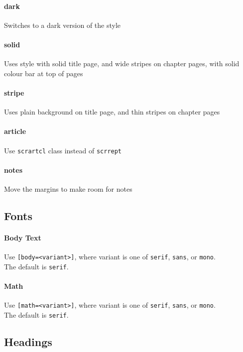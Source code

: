 \documentclass[solid,math,chem,code,plot,gloss]{bmc}
\begin{document}
\paragraph{\ttfamily dark}
Switches to a dark version of the style
\paragraph{\ttfamily solid}
Uses style with solid title page, and wide stripes on chapter pages, with solid colour bar at top of pages
\paragraph{\ttfamily stripe}
Uses plain background on title page, and thin stripes on chapter pages
\paragraph{\ttfamily article}
Use \texttt{scrartcl} class instead of \texttt{scrrept}
\paragraph{\ttfamily notes}
Move the margins to make room for notes

\subsection{Fonts}
\paragraph{Body Text}
Use \texttt{[body=<variant>]}, where variant is one of  \texttt{serif}, \texttt{sans}, or \texttt{mono}.
\\The default is \texttt{serif}.

\paragraph{Math}
Use \texttt{[math=<variant>]}, where variant is one of  \texttt{serif}, \texttt{sans}, or \texttt{mono}.
\\The default is \texttt{serif}.

\subsection{Headings}
\end{document}
